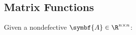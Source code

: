 \documentclass{article}
\begin{document}
\begin{multicols*}{3}
    \subsection{Matrix Functions}
    Given a nondefective \(\symbf{A} \in \R^{n \times n}\):

\end{multicols*}
\end{document}
